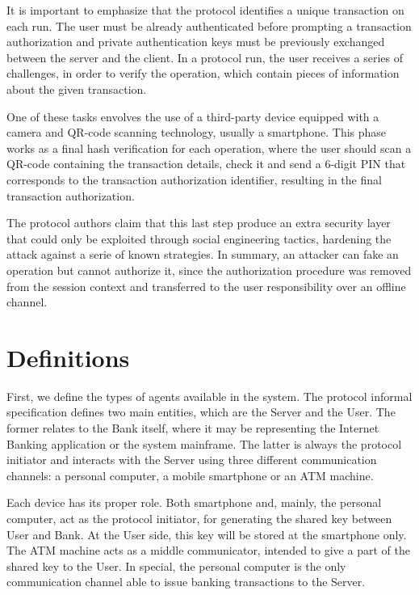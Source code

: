 It is important to emphasize that the protocol identifies a unique transaction on each run. The user must be already authenticated before prompting a transaction authorization and private authentication keys must be previously exchanged between the server and the client. In a protocol run, the user receives a series of challenges, in order to verify the operation, which contain pieces of information about the given transaction.

One of these tasks envolves the use of a third-party device equipped with a camera and QR-code scanning technology, usually a smartphone. This phase works as a final hash verification for each operation, where the user should scan a QR-code containing the transaction details, check it and send a 6-digit PIN that corresponds to the transaction authorization identifier, resulting in the final transaction authorization.

The protocol authors claim that this last step produce an extra security layer that could only be exploited through social engineering tactics, hardening the attack against a serie of known strategies. In summary, an attacker can fake an operation but cannot authorize it, since the authorization procedure was removed from the session context and transferred to the user responsibility over an offline channel.





\section{Definitions}
First, we define the types of agents available in the system. The protocol informal specification defines two main entities, which are the Server and the User. The former relates to the Bank itself, where it may be representing the Internet Banking application or the system mainframe. The latter is always the protocol initiator and interacts with the Server using three different communication channels: a personal computer, a mobile smartphone or an ATM machine.

Each device has its proper role. Both smartphone and, mainly, the personal computer, act as the protocol initiator, for generating the shared key between User and Bank. At the User side, this key will be stored at the smartphone only. The ATM machine acts as a middle communicator, intended to give a part of the shared key to the User. In special, the personal computer is the only communication channel able to issue banking transactions to the Server.

